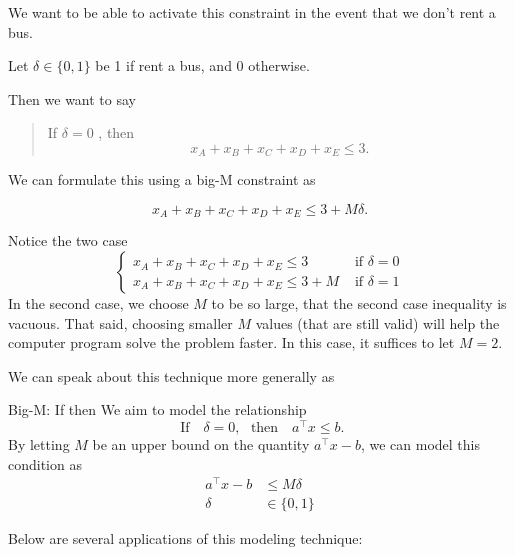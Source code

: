 We want to be able to activate this constraint in the event that we don't rent a bus.

Let $\delta \in \{0,1\}$ be 1 if rent a bus, and 0 otherwise.  

Then we want to say
\begin{quote}
If $\delta = 0$ , then 
$$
x_A + x_B + x_C + x_D + x_E \leq 3.
$$
\end{quote}

We can formulate this using a big-M constraint as

\begin{equation}
x_A + x_B + x_C + x_D + x_E \leq 3 + M \delta.
\end{equation}

Notice the two case
$$
\begin{cases}
x_A + x_B + x_C + x_D + x_E \leq 3  & \text{ if } \delta = 0\\
x_A + x_B + x_C + x_D + x_E \leq 3 +M & \text{ if } \delta = 1
\end{cases}
$$
In the second case, we choose $M$ to be so large, that the second case inequality is vacuous.    That said, choosing smaller $M$ values (that are still valid) will help the computer program solve the problem faster.  In this case, it suffices to let $M = 2$.

We can speak about this technique more generally as
\begin{general}{Big-M: If then}{}{}
We aim to model the relationship
\begin{equation}
\text{ If } \ \ \   \delta = 0, \ \ \  \text{then  } \ \ \ a^\top x \leq b.
\end{equation}
By letting $M$ be an upper bound on the quantity $a^\top x - b$, we can model this condition as 
\begin{equation}
\begin{split}
a^\top x - b& \leq M\delta\\
\delta & \in \{0,1\}
\end{split}
\end{equation}
\end{general}

Below are several applications of this modeling technique:

